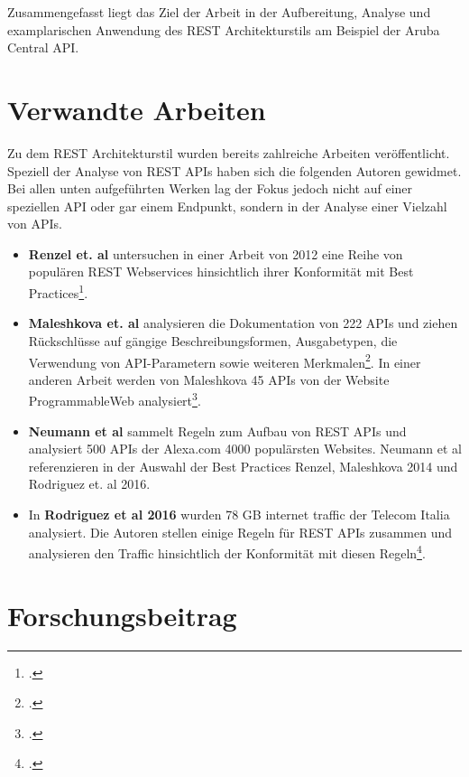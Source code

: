 Zusammengefasst liegt das Ziel der Arbeit in der Aufbereitung, Analyse und examplarischen Anwendung des REST Architekturstils am Beispiel der Aruba Central API.

\section{Verwandte Arbeiten}\label{section:verwandte-arbeiten}

Zu dem REST Architekturstil wurden bereits zahlreiche Arbeiten veröffentlicht. Speziell der Analyse von REST APIs haben sich die folgenden Autoren gewidmet. Bei allen unten aufgeführten Werken lag der Fokus jedoch nicht auf einer speziellen API oder gar einem Endpunkt, sondern in der Analyse einer Vielzahl von APIs.

\begin{itemize}
    \item \textbf{Renzel et. al} untersuchen in einer Arbeit von 2012 eine Reihe von populären REST Webservices hinsichtlich ihrer Konformität mit Best Practices\footcite[Vgl. ][]{hutchison_todays_2012}.

    \item \textbf{Maleshkova et. al} analysieren die Dokumentation von 222 APIs und ziehen Rückschlüsse auf gängige Beschreibungsformen, Ausgabetypen, die Verwendung von API-Parametern sowie weiteren Merkmalen\footcite[Vgl. ][]{maleshkova_investigating_2010}. In einer anderen Arbeit werden von Maleshkova 45 APIs von der Website ProgrammableWeb analysiert\footcite[Vgl. ][]{presutti_restful_2014}. 

    \item \textbf{Neumann et al} sammelt Regeln zum Aufbau von REST APIs und analysiert 500 APIs der Alexa.com 4000 populärsten Websites. Neumann et al referenzieren in der Auswahl der Best Practices Renzel, Maleshkova 2014 und Rodriguez et. al 2016.

    \item In \textbf{Rodriguez et al 2016} wurden 78 GB internet traffic der Telecom Italia analysiert. Die Autoren stellen einige Regeln für REST APIs zusammen und analysieren den Traffic hinsichtlich der Konformität mit diesen Regeln\footcite[Vgl. ][]{rodriguez_rest_2016}. 

\end{itemize}

\section{Forschungsbeitrag}\label{section:forschungsbeitrag}

